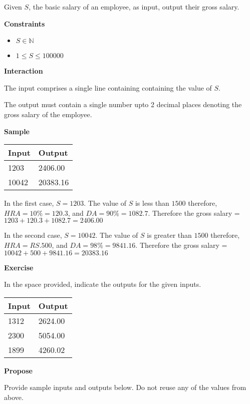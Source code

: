 \documentclass[a4paper]{exam}
\newcommand\heading[1]{\textbf{#1}}
\newcommand\inn{\in \mathbb{N}}
\begin{document}
\begin{questions}
    Given $S$, the basic salary of an employee, as input, output their gross salary.

    \heading{Constraints}
    \begin{itemize}
        \item $S \inn$
        \item $1 \le S \le 100000$
    \end{itemize}


    \heading{Interaction}

    The input comprises a single line containing containing the value of $S$.

    The output must contain a single number upto 2 decimal places denoting the gross salary of the employee.

    \heading{Sample}

    \begin{tabularx}{\textwidth}{|X|X|}
        \rowcolor{gray!50}
        \hline
        Input & Output   \\ \hline\hline
        1203  & 2406.00  \\\hline
        10042 & 20383.16 \\\hline
    \end{tabularx}

    In the first case, $S=1203$. The value of $S$ is less than $1500$ therefore, $HRA = 10\% = 120.3$, and $DA = 90\% = 1082.7$. Therefore the gross salary = $1203+120.3+1082.7 = 2406.00$

    In the second case, $S=10042$. The value of $S$ is greater than $1500$ therefore, $HRA = RS.500$, and $DA = 98\% = 9841.16$. Therefore the gross salary = $10042 + 500 + 9841.16 = 20383.16$

    \heading{Exercise}

    In the space provided, indicate the outputs for the given inputs.

    \begin{tabularx}{\textwidth}{|X|X|}
        \rowcolor{gray!50}
        \hline
        Input & Output  \\ \hline\hline
        1312  & 2624.00 \\\hline
        2300  & 5054.00 \\\hline
        1899  & 4260.02 \\\hline
    \end{tabularx}

    \heading{Propose}

    Provide sample inputs and outputs below. Do not reuse any of the values from above.


\end{questions}
\end{document}
